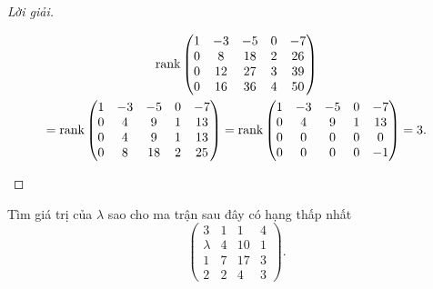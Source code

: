 \documentclass[class=linearalgebra,crop=false]{standalone}
\begin{document}
\begin{proof}[Lời giải]
\begin{enumerate}[label = (\alph*)]
\begin{gather*}
                  \text{rank}\begin{pmatrix}
                      1 & -3 & -5 & 0 & -7 \\
                      0 & 8  & 18 & 2 & 26 \\
                      0 & 12 & 27 & 3 & 39 \\
                      0 & 16 & 36 & 4 & 50
                  \end{pmatrix} \\
                  =\text{rank}\begin{pmatrix}
                      1 & -3 & -5 & 0 & -7 \\
                      0 & 4  & 9  & 1 & 13 \\
                      0 & 4  & 9  & 1 & 13 \\
                      0 & 8  & 18 & 2 & 25
                  \end{pmatrix}
                  =\text{rank}\begin{pmatrix}
                      1 & -3 & -5 & 0 & -7 \\
                      0 & 4  & 9  & 1 & 13 \\
                      0 & 0  & 0  & 0 & 0  \\
                      0 & 0  & 0  & 0 & -1
                  \end{pmatrix}
                  = 3.
              \end{gather*}
              \endgroup
    \end{enumerate}
\end{proof}

\begin{exercise}
    \par Tìm giá trị của $\lambda$ sao cho ma trận sau đây có hạng thấp nhất
    \[
        \begin{pmatrix}
            3       & 1 & 1  & 4 \\
            \lambda & 4 & 10 & 1 \\
            1       & 7 & 17 & 3 \\
            2       & 2 & 4  & 3
        \end{pmatrix}.
    \]
\end{exercise}
\end{document}

